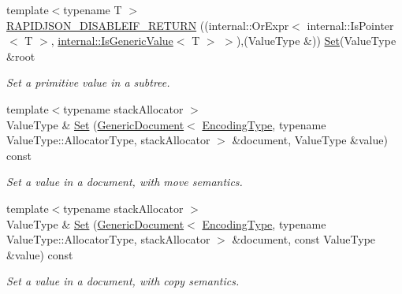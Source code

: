\begin{DoxyCompactItemize}
{\footnotesize template$<$typename T $>$ }\\\hyperlink{class_generic_pointer_a914bbdd96e2a248e035b8ebd68526369}{R\+A\+P\+I\+D\+J\+S\+O\+N\+\_\+\+D\+I\+S\+A\+B\+L\+E\+I\+F\+\_\+\+R\+E\+T\+U\+RN} ((internal\+::\+Or\+Expr$<$ internal\+::\+Is\+Pointer$<$ T $>$, \hyperlink{structinternal_1_1_is_generic_value}{internal\+::\+Is\+Generic\+Value}$<$ T $>$ $>$),(Value\+Type \&)) \hyperlink{class_generic_pointer_a71476d125a276b62a246990da1bd3468}{Set}(Value\+Type \&root
\begin{DoxyCompactList}\small\item\em Set a primitive value in a subtree. \end{DoxyCompactList}\item 
\mbox{\label{class_generic_pointer_aeec3daf051dfa8b8fbf23ea4f9a238e4}} 
{\footnotesize template$<$typename stack\+Allocator $>$ }\\Value\+Type \& \hyperlink{class_generic_pointer_aeec3daf051dfa8b8fbf23ea4f9a238e4}{Set} (\hyperlink{class_generic_document}{Generic\+Document}$<$ \hyperlink{class_generic_pointer_a4b802da797a7a0b615fd9611cedb7c3b}{Encoding\+Type}, typename Value\+Type\+::\+Allocator\+Type, stack\+Allocator $>$ \&document, Value\+Type \&value) const
\begin{DoxyCompactList}\small\item\em Set a value in a document, with move semantics. \end{DoxyCompactList}\item 
\mbox{\label{class_generic_pointer_a8ed0a7ce95331b7433371df7150b84a9}} 
{\footnotesize template$<$typename stack\+Allocator $>$ }\\Value\+Type \& \hyperlink{class_generic_pointer_a8ed0a7ce95331b7433371df7150b84a9}{Set} (\hyperlink{class_generic_document}{Generic\+Document}$<$ \hyperlink{class_generic_pointer_a4b802da797a7a0b615fd9611cedb7c3b}{Encoding\+Type}, typename Value\+Type\+::\+Allocator\+Type, stack\+Allocator $>$ \&document, const Value\+Type \&value) const
\begin{DoxyCompactList}\small\item\em Set a value in a document, with copy semantics. \end{DoxyCompactList}\item 
\mbox{\label{class_generic_pointer_abaa0cda4ed84a4435871d355279bab8e}} 

\end{DoxyCompactItemize}
